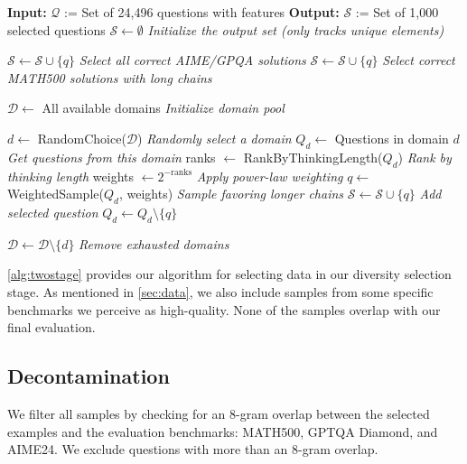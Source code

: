 \documentclass{article}
\theoremstyle{plain}
\theoremstyle{definition}
\theoremstyle{remark}
\newcommand{\data}{\textbf{CoR-1K}}
\begin{document}
\begin{algorithm}
\caption{Two-stage sampling for \data{}}
\label{alg:twostage}
\begin{algorithmic}[1]
\STATE \textbf{Input:} $\mathcal{Q}$ := Set of 24,496 questions with features
\STATE \textbf{Output:} $\mathcal{S}$ := Set of 1,000 selected questions
\STATE $\mathcal{S} \gets \emptyset$ \hfill \textit{Initialize the output set (only tracks unique elements)}

        \STATE $\mathcal{S} \gets \mathcal{S} \cup \{q\}$ 
        \STATE \hfill \textit{Select all correct AIME/GPQA solutions}
        \STATE $\mathcal{S} \gets \mathcal{S} \cup \{q\}$ 
        \STATE \hfill \textit{Select correct MATH500 solutions with long chains}
    \ENDIF
\ENDFOR

\STATE $\mathcal{D} \gets$ All available domains 
\STATE \hfill \textit{Initialize domain pool}

    \STATE $d \gets$ RandomChoice($\mathcal{D}$) 
    \STATE \hfill \textit{Randomly select a domain}
    \STATE $Q_d \gets$ Questions in domain $d$ 
    \STATE \hfill \textit{Get questions from this domain}
    \STATE ranks $\gets$ RankByThinkingLength($Q_d$) 
    \STATE \hfill \textit{Rank by thinking length}
    \STATE weights $\gets 2^{-\text{ranks}}$ 
    \STATE \hfill \textit{Apply power-law weighting}
    \STATE $q \gets$ WeightedSample($Q_d$, weights) 
    \STATE \hfill \textit{Sample favoring longer chains}
    \STATE $\mathcal{S} \gets \mathcal{S} \cup \{q\}$ 
    \STATE \hfill \textit{Add selected question}
    \STATE $Q_d \gets Q_d \setminus \{q\}$ 

        \STATE $\mathcal{D} \gets \mathcal{D} \setminus \{d\}$ 
        \STATE \hfill \textit{Remove exhausted domains}
    \ENDIF
\ENDWHILE
\end{algorithmic}
\end{algorithm}

\autoref{alg:twostage} provides our algorithm for selecting data in our diversity selection stage. As mentioned in \autoref{sec:data}, we also include samples from some specific benchmarks we perceive as high-quality. None of the samples overlap with our final evaluation.

\subsection{Decontamination}
\label{sec:decontaminate}
We filter all samples by checking for an 8-gram overlap between the selected examples and the evaluation benchmarks: MATH500, GPTQA Diamond, and AIME24. We exclude questions with more than an 8-gram overlap.
\end{document}
